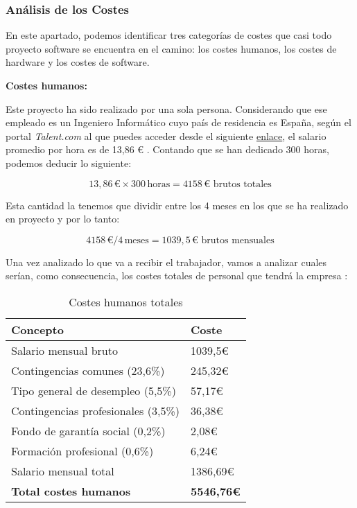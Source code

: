 \subsubsection{Análisis de los Costes}

En este apartado, podemos identificar tres categorías de costes que casi todo proyecto software se encuentra en el camino:  los costes humanos, los costes de hardware y los costes de software.

\textbf{Costes humanos:}

Este proyecto ha sido realizado por una sola persona. Considerando que ese empleado es un Ingeniero Informático cuyo país de residencia es España, según el portal \textit{Talent.com} al que puedes acceder desde el siguiente \href{https://es.talent.com/salary?job=ingeniero+inform%C3%A1tico}{enlace}, el salario promedio por hora es de 13,86 € \cite{salarioingeniero:latex}. Contando que se han dedicado 300 horas, podemos deducir lo siguiente:

\[ 13,86 \, \text{€} \times 300 \, \text{horas} = 4158 \, \text{€ brutos totales} \]

Esta cantidad la tenemos que dividir entre los 4 meses en los que se ha realizado en proyecto y por lo tanto:

\[ 4158 \, \text{€} / 4 \, \text{meses} = 1039,5 \, \text{€ brutos mensuales} \]

Una vez analizado lo que va a recibir el trabajador, vamos a analizar cuales serían, como consecuencia, los costes totales de personal que tendrá la empresa \cite{costetrabajador:latex}:
 

\begin{table}[H]
    \centering
    \renewcommand{\arraystretch}{1.2}
    \setlength{\tabcolsep}{20pt}
    \begin{tabular}{l l}
        \hline
        \textbf{Concepto} & \textbf{Coste} \\ \hline
        Salario mensual bruto & 1039,5€ \\
        Contingencias comunes (23,6\%) & 245,32€\\
        Tipo general de  desempleo (5,5\%) & 57,17€\\
        Contingencias profesionales (3,5\%) & 36,38€\\
        Fondo de garantía social (0,2\%)& 2,08€\\
        Formación profesional (0,6\%) & 6,24€\\
        Salario mensual total & 1386,69€\\  \hline
        \textbf{Total costes humanos} & \textbf{5546,76€}\\ \hline
    \end{tabular}
    \caption{Costes humanos totales}
    \label{tab:costes_humanos}
\end{table}

